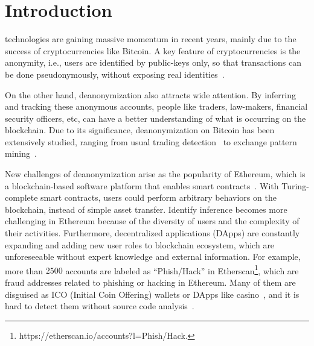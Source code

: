 \section{Introduction}
 technologies are gaining massive momentum in recent years, mainly due to the success of cryptocurrencies like Bitcoin. A key feature of cryptocurrencies is the anonymity, i.e., users are identified by public-keys only, so that transactions can be done pseudonymously, without exposing real identities~\cite{reid2013analysis}.

On the other hand, deanonymization also attracts wide attention. By inferring and tracking these anonymous accounts, people like traders, law-makers, financial security officers, etc, can have a better understanding of what is occurring on the blockchain. Due to its significance, deanonymization on Bitcoin has been extensively studied, ranging from usual trading detection~\cite{maesa2016analysis} to exchange pattern mining~\cite{ranshous2017exchange}.
 
 

New challenges of deanonymization arise as the popularity of Ethereum, which is a blockchain-based software platform that enables smart contracts~\cite{buterin2013ethereum}.
With Turing-complete smart contracts, users could perform arbitrary behaviors on the blockchain, instead of simple asset transfer. 
Identify inference becomes more challenging in Ethereum because of the diversity of users and the complexity of their activities. Furthermore, decentralized applications (DApps) are constantly expanding and adding new user roles to blockchain ecosystem, which are unforeseeable without expert knowledge and external information.
For example, more than $2500$ accounts are labeled as ``Phish/Hack'' in Etherscan\footnote{https://etherscan.io/accounts?l=Phish/Hack.}, which are fraud addresses related to phishing or hacking in Ethereum. Many of them are disguised as ICO (Initial Coin Offering) wallets or DApps like casino~\cite{cerchiello2018icos}, and it is hard to detect them without source code analysis~\cite{jiang2018contractfuzzer}. 


